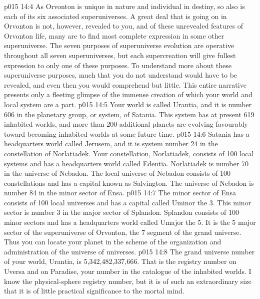 \vs p015 14:4 As Orvonton is unique in nature and individual in destiny, so also is each of its six associated superuniverses. A great deal that is going on in Orvonton is not, however, revealed to you, and of these unrevealed features of Orvonton life, many are to find most complete expression in some other superuniverse. The seven purposes of superuniverse evolution are operative throughout all seven superuniverses, but each supercreation will give fullest expression to only one of these purposes. To understand more about these superuniverse purposes, much that you do not understand would have to be revealed, and even then you would comprehend but little. This entire narrative presents only a fleeting glimpse of the immense creation of which your world and local system are a part.
\vs p015 14:5 \pc Your world is called Urantia, and it is number 606 in the planetary group, or system, of Satania. This system has at present 619 inhabited worlds, and more than 200 additional planets are evolving favourably toward becoming inhabited worlds at some future time.
\vs p015 14:6 Satania has a headquarters world called Jerusem, and it is system number 24 in the constellation of Norlatiadek. Your constellation, Norlatiadek, consists of 100 local systems and has a headquarters world called Edentia. Norlatiadek is number 70 in the universe of Nebadon. The local universe of Nebadon consists of 100 constellations and has a capital known as Salvington. The universe of Nebadon is number 84 in the minor sector of Ensa.
\vs p015 14:7 The minor sector of Ensa consists of 100 local universes and has a capital called Uminor the 3. This minor sector is number 3 in the major sector of Splandon. Splandon consists of 100 minor sectors and has a headquarters world called Umajor the 5. It is the 5 major sector of the superuniverse of Orvonton, the 7 segment of the grand universe. Thus you can locate your planet in the scheme of the organization and administration of the universe of universes.
\vs p015 14:8 The grand universe number of your world, Urantia, is 5,342,482,337,666. That is the registry number on Uversa and on Paradise, your number in the catalogue of the inhabited worlds. I know the physical\hyp{}sphere registry number, but it is of such an extraordinary size that it is of little practical significance to the mortal mind.
